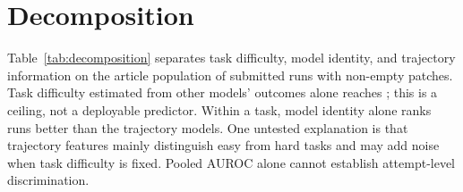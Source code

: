 \section{Decomposition}
\label{sec:decomposition}


Table~\ref{tab:decomposition} separates task difficulty, model identity, and trajectory information on the article population of  submitted runs with non-empty patches. Task difficulty estimated from other models' outcomes alone reaches ; this is a ceiling, not a deployable predictor. Within a task, model identity alone ranks runs better than the trajectory models. One untested explanation is that trajectory features mainly distinguish easy from hard tasks and may add noise when task difficulty is fixed. Pooled AUROC alone cannot establish attempt-level discrimination.

